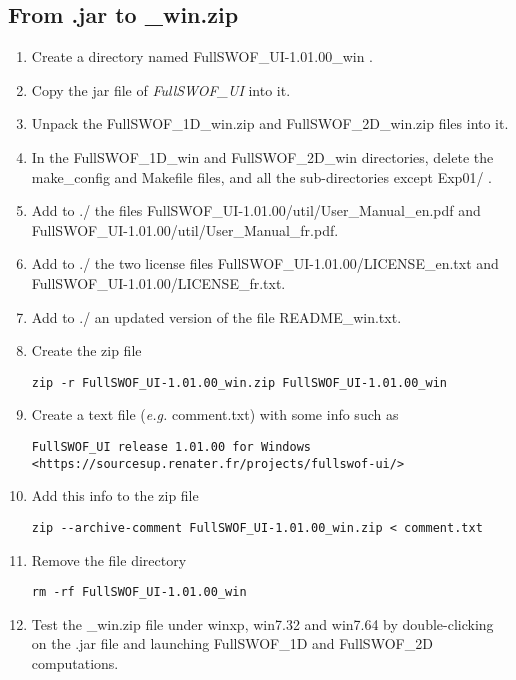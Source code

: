 \documentclass[a4paper, 11pt]{article}
\newcommand{\FullSWOFUI}{\emph{FullSWOF\_UI}}
\begin{document}
\subsection{From .jar  to \_win.zip}
\begin{enumerate}

\item Create a directory named FullSWOF\_UI-1.01.00\_win .

\item Copy the jar file of \FullSWOFUI{} into it.

\item Unpack the FullSWOF\_1D\_win.zip and FullSWOF\_2D\_win.zip files into it.

\item In the FullSWOF\_1D\_win and FullSWOF\_2D\_win directories, delete the make\_config and Makefile files, and all the sub-directories except Exp01/ .

\item Add to ./ the files 
FullSWOF\_UI-1.01.00/util/User\_Manual\_en.pdf and
FullSWOF\_UI-1.01.00/util/User\_Manual\_fr.pdf.

\item Add to ./ the two license files FullSWOF\_UI-1.01.00/LICENSE\_en.txt and
FullSWOF\_UI-1.01.00/LICENSE\_fr.txt.

\item Add to ./ an updated version of the file README\_win.txt.

\item Create the zip file
\begin{verbatim}
zip -r FullSWOF_UI-1.01.00_win.zip FullSWOF_UI-1.01.00_win
\end{verbatim}
\item Create a text file (\emph{e.g.} comment.txt) with some info such as
\begin{verbatim}
FullSWOF_UI release 1.01.00 for Windows
<https://sourcesup.renater.fr/projects/fullswof-ui/>
\end{verbatim}
\item Add this info to the zip file
\begin{verbatim}
zip --archive-comment FullSWOF_UI-1.01.00_win.zip < comment.txt
\end{verbatim}
\item Remove the file directory
\begin{verbatim}
rm -rf FullSWOF_UI-1.01.00_win
\end{verbatim}
\item Test the \_win.zip file under winxp, win7.32 and win7.64 by
double-clicking on the .jar file and launching FullSWOF\_1D and FullSWOF\_2D computations.
\end{enumerate}
\end{document}
